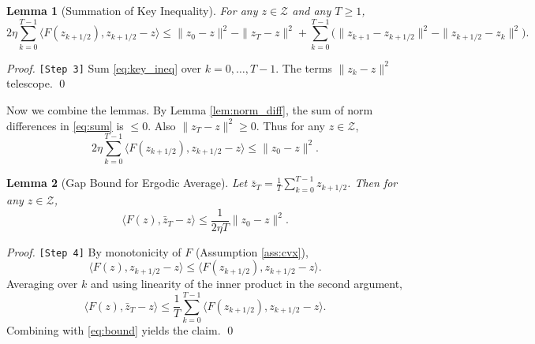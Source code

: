 \documentclass{article}
\theoremstyle{plain}
\newtheorem{lemma}{Lemma}
\theoremstyle{definition}
\begin{document}
\begin{lemma}[Summation of Key Inequality] \label{lem:sum}
For any $z \in \mathcal{Z}$ and any $T \ge 1$,
\begin{equation} \label{eq:sum}
2\eta \sum_{k=0}^{T-1} \langle F(z_{k+1/2}), z_{k+1/2} - z \rangle \le \|z_0 - z\|^2 - \|z_T - z\|^2 + \sum_{k=0}^{T-1} \bigl( \|z_{k+1} - z_{k+1/2}\|^2 - \|z_{k+1/2} - z_k\|^2 \bigr).
\end{equation}
\end{lemma}
\begin{proof} \texttt{[Step 3]}
Sum \eqref{eq:key_ineq} over $k=0,\dots,T-1$. The terms $\|z_k - z\|^2$ telescope. \qed
\end{proof}

Now we combine the lemmas. By Lemma \ref{lem:norm_diff}, the sum of norm differences in \eqref{eq:sum} is $\le 0$. Also $\|z_T - z\|^2 \ge 0$. Thus for any $z \in \mathcal{Z}$,
\begin{equation} \label{eq:bound}
2\eta \sum_{k=0}^{T-1} \langle F(z_{k+1/2}), z_{k+1/2} - z \rangle \le \|z_0 - z\|^2.
\end{equation}

\begin{lemma}[Gap Bound for Ergodic Average] \label{lem:gap}
Let $\bar{z}_T = \frac{1}{T}\sum_{k=0}^{T-1} z_{k+1/2}$. Then for any $z \in \mathcal{Z}$,
\[
\langle F(z), \bar{z}_T - z \rangle \le \frac{1}{2\eta T} \|z_0 - z\|^2.
\]
\end{lemma}
\begin{proof} \texttt{[Step 4]}
By monotonicity of $F$ (Assumption \ref{ass:cvx}),
\[
\langle F(z), z_{k+1/2} - z \rangle \le \langle F(z_{k+1/2}), z_{k+1/2} - z \rangle.
\]
Averaging over $k$ and using linearity of the inner product in the second argument,
\[
\langle F(z), \bar{z}_T - z \rangle \le \frac{1}{T} \sum_{k=0}^{T-1} \langle F(z_{k+1/2}), z_{k+1/2} - z \rangle.
\]
Combining with \eqref{eq:bound} yields the claim. \qed
\end{proof}
\end{document}
